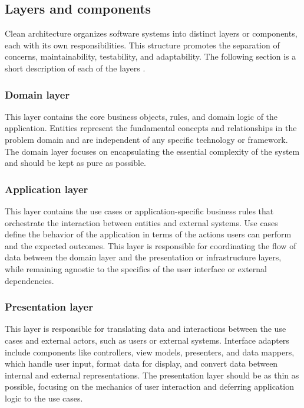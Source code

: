 \subsection{Layers and components} \label{subsec:layers}

Clean architecture organizes software systems into distinct layers or components, each
with its own responsibilities. This structure promotes the separation of concerns,
maintainability, testability, and adaptability. The following section is a short
description of each of the layers \parencite{robert_c_martin_clean_2018}.

\subsubsection{Domain layer}
This layer contains the core business objects, rules, and domain logic of the application.
Entities represent the fundamental concepts and relationships in the problem domain and
are independent of any specific technology or framework. The domain layer focuses on
encapsulating the essential complexity of the system and should be kept as pure as
possible.

\subsubsection{Application layer}
This layer contains the use cases or application-specific
business rules that orchestrate the interaction between entities and external systems. Use
cases define the behavior of the application in terms of the actions users can perform and
the expected outcomes. This layer is responsible for coordinating the flow of data between
the domain layer and the presentation or infrastructure layers, while remaining agnostic
to the specifics of the user interface or external dependencies.

\subsubsection{Presentation layer}
This layer is responsible for translating data and interactions between the use cases and
external actors, such as users or external systems. Interface adapters include components
like controllers, view models, presenters, and data mappers, which handle user input,
format data for display, and convert data between internal and external representations.
The presentation layer should be as thin as possible, focusing on the mechanics of user
interaction and deferring application logic to the use cases.

